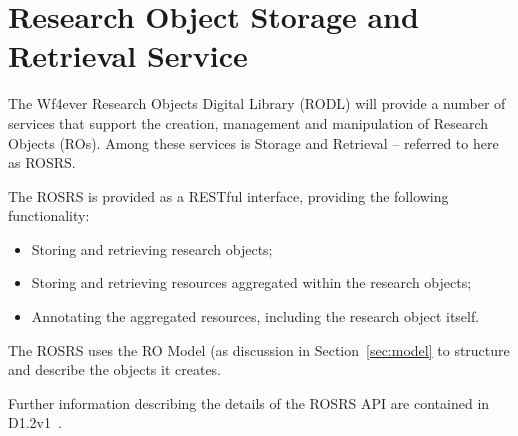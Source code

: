\section{Research Object Storage and Retrieval Service}
\label{sec:rosrs}

The Wf4ever Research Objects Digital Library (RODL) will provide a number of services that support the creation, management and manipulation of Research Objects (ROs). Among these services is Storage and Retrieval -- referred to here as ROSRS. 

The ROSRS is provided as a RESTful interface, providing the following functionality:

\begin{itemize}
\item Storing and retrieving research objects;
\item Storing and retrieving resources aggregated within the research objects;
\item Annotating the aggregated resources, including the research object itself. 
\end{itemize}

The ROSRS uses the RO Model (as discussion in Section~\ref{sec:model} to structure and describe the objects it creates. 

Further information describing the details of the ROSRS API are contained in D1.2v1~\cite{D1.4v1}.


